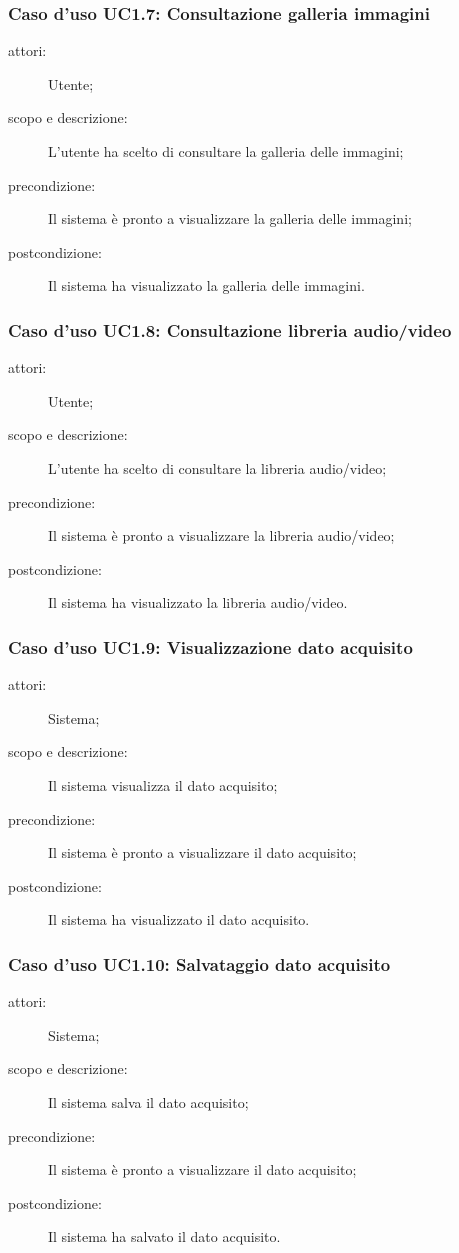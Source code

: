 \subsubsection{Caso d'uso UC1.7: Consultazione galleria immagini}
\begin{description}
\item[attori:] Utente;
\item[scopo e descrizione:] L'utente ha scelto di consultare la galleria delle immagini;
\item[precondizione:] Il sistema è pronto a visualizzare la galleria delle immagini;
\item[postcondizione:] Il sistema ha visualizzato la galleria delle immagini.
\end{description}

\subsubsection{Caso d'uso UC1.8: Consultazione libreria audio/video}
\begin{description}
\item[attori:] Utente;
\item[scopo e descrizione:] L'utente ha scelto di consultare la libreria audio/video;
\item[precondizione:] Il sistema è pronto a visualizzare la libreria audio/video;
\item[postcondizione:] Il sistema ha visualizzato la libreria audio/video.
\end{description}

\subsubsection{Caso d'uso UC1.9: Visualizzazione dato acquisito}
\begin{description}
\item[attori:] Sistema;
\item[scopo e descrizione:] Il sistema visualizza il dato acquisito;
\item[precondizione:] Il sistema è pronto a visualizzare il dato acquisito;
\item[postcondizione:] Il sistema ha visualizzato il dato acquisito.
\end{description}

\subsubsection{Caso d'uso UC1.10: Salvataggio dato acquisito}
\begin{description}
\item[attori:] Sistema;
\item[scopo e descrizione:] Il sistema salva il dato acquisito;
\item[precondizione:] Il sistema è pronto a visualizzare il dato acquisito;
\item[postcondizione:] Il sistema ha salvato il dato acquisito.
\end{description}

